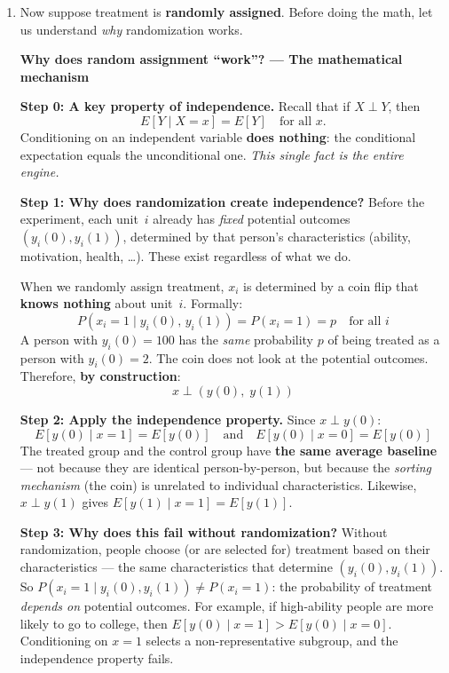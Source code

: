 \documentclass[11pt,a4paper]{article}
\begin{document}
\begin{enumerate}[label=(\alph*)]
\begin{solution}
\textbf{Negative bias (Job training):} Workers with worse prospects sign up for training. They would earn less \emph{even without} the program, so $E[y(0) \mid x{=}1] < E[y(0) \mid x{=}0]$. The naive comparison \emph{understates} the program's effect.
\end{solution}

\item Now suppose treatment is \textbf{randomly assigned}. Before doing the math, let us understand \emph{why} randomization works.

\begin{bookexample}
\textbf{\color{blockcolor}Why does random assignment ``work''? --- The mathematical mechanism}

\smallskip
\textbf{Step 0: A key property of independence.} Recall that if $X \perp Y$, then
\[
  E[Y \mid X = x] = E[Y] \quad \text{for all } x.
\]
Conditioning on an independent variable \textbf{does nothing}: the conditional expectation equals the unconditional one. \emph{This single fact is the entire engine.}

\smallskip
\textbf{Step 1: Why does randomization create independence?} Before the experiment, each unit~$i$ already has \emph{fixed} potential outcomes $(y_i(0), y_i(1))$, determined by that person's characteristics (ability, motivation, health, \dots). These exist regardless of what we do.

When we randomly assign treatment, $x_i$ is determined by a coin flip that \textbf{knows nothing} about unit~$i$. Formally:
\[
  P(x_i = 1 \mid y_i(0),\, y_i(1)) = P(x_i = 1) = p \quad \text{for all } i
\]
A person with $y_i(0) = 100$ has the \emph{same} probability $p$ of being treated as a person with $y_i(0) = 2$. The coin does not look at the potential outcomes. Therefore, \textbf{by construction}:
\[
  \boxed{x \perp (y(0),\; y(1))}
\]

\smallskip
\textbf{Step 2: Apply the independence property.} Since $x \perp y(0)$:
\[
  E[y(0) \mid x{=}1] = E[y(0)] \quad\text{and}\quad E[y(0) \mid x{=}0] = E[y(0)]
\]
The treated group and the control group have \textbf{the same average baseline} --- not because they are identical person-by-person, but because the \emph{sorting mechanism} (the coin) is unrelated to individual characteristics. Likewise, $x \perp y(1)$ gives $E[y(1) \mid x{=}1] = E[y(1)]$.

\smallskip
\textbf{Step 3: Why does this fail without randomization?} Without randomization, people choose (or are selected for) treatment based on their characteristics --- the same characteristics that determine $(y_i(0), y_i(1))$. So $P(x_i = 1 \mid y_i(0), y_i(1)) \neq P(x_i = 1)$: the probability of treatment \emph{depends on} potential outcomes. For example, if high-ability people are more likely to go to college, then $E[y(0) \mid x{=}1] > E[y(0) \mid x{=}0]$. Conditioning on $x = 1$ selects a non-representative subgroup, and the independence property fails.
\end{bookexample}


\end{enumerate}
\end{document}
